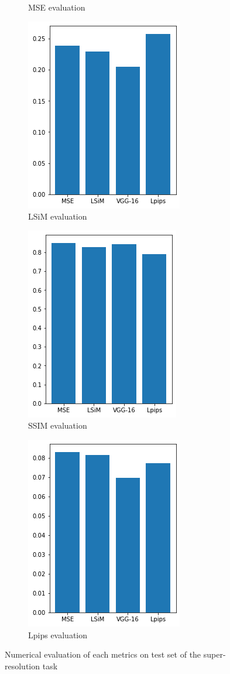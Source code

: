 \documentclass[a4paper,12pt,twoside]{report}
\begin{document}
\begin{figure}
\begin{subfigure}{0.32\textwidth}
		\caption{MSE evaluation}
	\end{subfigure}
	\begin{subfigure}{0.32\textwidth}
		\centering
		\includegraphics[scale=0.5]{superresolution/lsim.png}
		\caption{LSiM evaluation}
	\end{subfigure}
	\begin{subfigure}{0.32\textwidth}
		\centering
		\includegraphics[scale=0.5]{superresolution/ssim.png}
		\caption{SSIM evaluation}
	\end{subfigure}
	\begin{subfigure}{0.32\textwidth}
		\centering
		\includegraphics[scale=0.5]{superresolution/lpips.png}
		\caption{Lpips evaluation}
	\end{subfigure}
	\caption{Numerical evaluation of each metrics on test set of the super-resolution task}
	\label{super numeval}
\end{figure}
\end{document}

